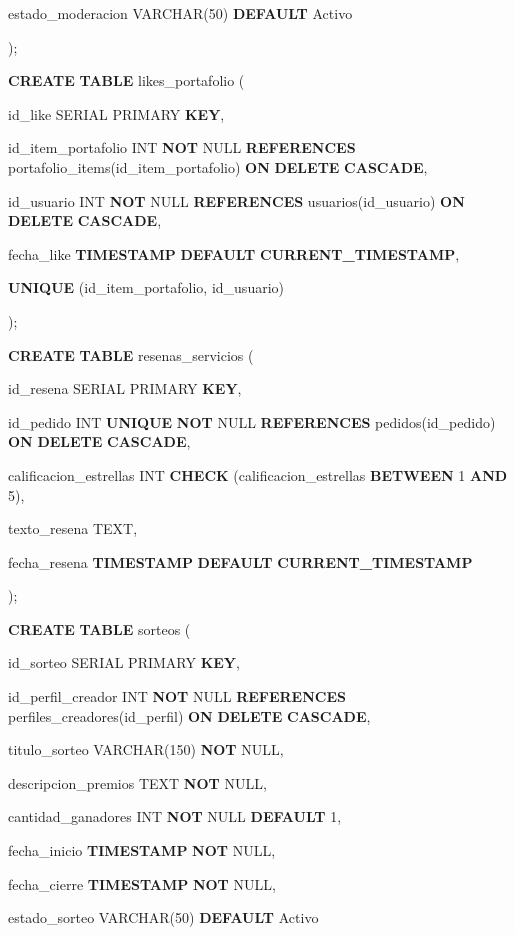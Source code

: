 \documentclass[
]{article}
\begin{document}
estado\_moderacion VARCHAR(50) \textbf{DEFAULT}
\textquotesingle Activo\textquotesingle{}

);

\textbf{CREATE} \textbf{TABLE} likes\_portafolio (

id\_like SERIAL PRIMARY \textbf{KEY},

id\_item\_portafolio INT \textbf{NOT} NULL \textbf{REFERENCES}
portafolio\_items(id\_item\_portafolio) \textbf{ON} \textbf{DELETE}
\textbf{CASCADE},

id\_usuario INT \textbf{NOT} NULL \textbf{REFERENCES}
usuarios(id\_usuario) \textbf{ON} \textbf{DELETE} \textbf{CASCADE},

fecha\_like \textbf{TIMESTAMP} \textbf{DEFAULT}
\textbf{CURRENT\_TIMESTAMP},

\textbf{UNIQUE} (id\_item\_portafolio, id\_usuario)

);

\textbf{CREATE} \textbf{TABLE} resenas\_servicios (

id\_resena SERIAL PRIMARY \textbf{KEY},

id\_pedido INT \textbf{UNIQUE} \textbf{NOT} NULL \textbf{REFERENCES}
pedidos(id\_pedido) \textbf{ON} \textbf{DELETE} \textbf{CASCADE},

calificacion\_estrellas INT \textbf{CHECK} (calificacion\_estrellas
\textbf{BETWEEN} 1 \textbf{AND} 5),

texto\_resena TEXT,

fecha\_resena \textbf{TIMESTAMP} \textbf{DEFAULT}
\textbf{CURRENT\_TIMESTAMP}

);

\textbf{CREATE} \textbf{TABLE} sorteos (

id\_sorteo SERIAL PRIMARY \textbf{KEY},

id\_perfil\_creador INT \textbf{NOT} NULL \textbf{REFERENCES}
perfiles\_creadores(id\_perfil) \textbf{ON} \textbf{DELETE}
\textbf{CASCADE},

titulo\_sorteo VARCHAR(150) \textbf{NOT} NULL,

descripcion\_premios TEXT \textbf{NOT} NULL,

cantidad\_ganadores INT \textbf{NOT} NULL \textbf{DEFAULT} 1,

fecha\_inicio \textbf{TIMESTAMP} \textbf{NOT} NULL,

fecha\_cierre \textbf{TIMESTAMP} \textbf{NOT} NULL,

estado\_sorteo VARCHAR(50) \textbf{DEFAULT}
\textquotesingle Activo\textquotesingle{}
\end{document}
